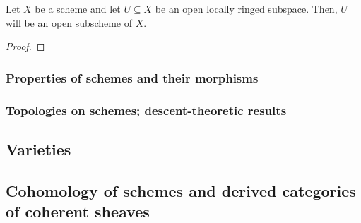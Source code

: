             \begin{proposition} \label{prop: open_subschemes_are_open_locally_ringed_subspaces}
                Let $X$ be a scheme and let $U \subseteq X$ be an open locally ringed subspace. Then, $U$ will be an open subscheme of $X$. 
            \end{proposition}
                \begin{proof}
                    
                \end{proof}
            \begin{corollary} \label{coro: zariski_bases_of_schemes}
                
            \end{corollary}
    
        \subsubsection{Properties of schemes and their morphisms}
        
        \subsubsection{Topologies on schemes; descent-theoretic results}
    
    \subsection{Varieties}

    \subsection{Cohomology of schemes and derived categories of coherent sheaves}